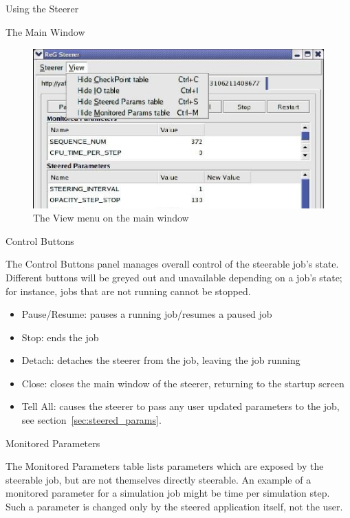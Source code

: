 \documentclass[a4paper,twoside]{article}
\begin{document}
\begin{section}{Using the Steerer}
\begin{subsection}{The Main Window}
\begin{figure}
\centerline{\includegraphics{main_view_menu.eps}}
\caption{The View menu on the main window}
\label{fig:view_menu}
\end{figure}

\begin{subsubsection}{Control Buttons}
\label{sec:control_btns}

The Control Buttons panel manages overall control of the steerable
job's state. Different buttons will be greyed out and unavailable
depending on a job's state; for instance, jobs that are not running
cannot be stopped.
\begin{itemize}
\item Pause/Resume: pauses a running job/resumes a paused job
\item Stop: ends the job
\item Detach: detaches the steerer from the job, leaving the 
job running
\item Close: closes the main window of the steerer, returning to the 
startup screen
\item Tell All: causes the steerer to pass any user updated 
parameters to the job, see section~\ref{sec:steered_params}.
\end{itemize}

\end{subsubsection} %

\begin{subsubsection}{Monitored Parameters}
\label{sec:mon_params}

The Monitored Parameters table lists parameters which are exposed by
the steerable job, but are not themselves directly steerable. An
example of a monitored parameter for a simulation job might be time
per simulation step. Such a parameter is changed only by the steered
application itself, not the user.


\end{subsubsection}
\end{subsection}
\end{section}
\end{document}
